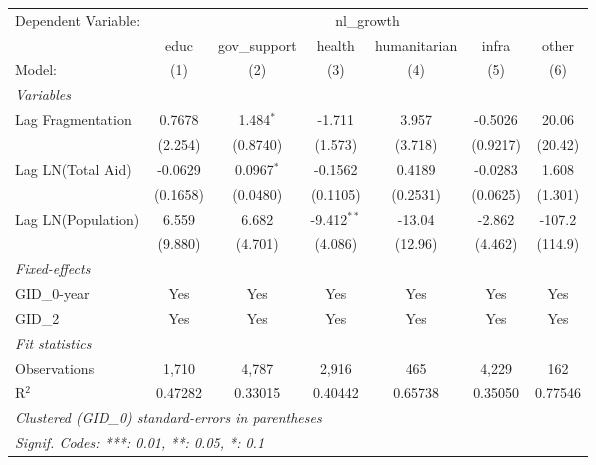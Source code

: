 \begingroup
\centering
\begin{tabular}{lcccccc}
   \tabularnewline \midrule \midrule
   Dependent Variable: & \multicolumn{6}{c}{nl\_growth}\\
                      & educ     & gov\_support  & health        & humanitarian & infra    & other \\   
   Model:             & (1)      & (2)           & (3)           & (4)          & (5)      & (6)\\  
   \midrule
   \emph{Variables}\\
   Lag Fragmentation  & 0.7678   & 1.484$^{*}$   & -1.711        & 3.957        & -0.5026  & 20.06\\   
                      & (2.254)  & (0.8740)      & (1.573)       & (3.718)      & (0.9217) & (20.42)\\   
   Lag LN(Total Aid)  & -0.0629  & 0.0967$^{*}$  & -0.1562       & 0.4189       & -0.0283  & 1.608\\   
                      & (0.1658) & (0.0480)      & (0.1105)      & (0.2531)     & (0.0625) & (1.301)\\   
   Lag LN(Population) & 6.559    & 6.682         & -9.412$^{**}$ & -13.04       & -2.862   & -107.2\\   
                      & (9.880)  & (4.701)       & (4.086)       & (12.96)      & (4.462)  & (114.9)\\   
   \midrule
   \emph{Fixed-effects}\\
   GID\_0-year        & Yes      & Yes           & Yes           & Yes          & Yes      & Yes\\  
   GID\_2             & Yes      & Yes           & Yes           & Yes          & Yes      & Yes\\  
   \midrule
   \emph{Fit statistics}\\
   Observations       & 1,710    & 4,787         & 2,916         & 465          & 4,229    & 162\\  
   R$^2$              & 0.47282  & 0.33015       & 0.40442       & 0.65738      & 0.35050  & 0.77546\\  
   \midrule \midrule
   \multicolumn{7}{l}{\emph{Clustered (GID\_0) standard-errors in parentheses}}\\
   \multicolumn{7}{l}{\emph{Signif. Codes: ***: 0.01, **: 0.05, *: 0.1}}\\
\end{tabular}
\par\endgroup



